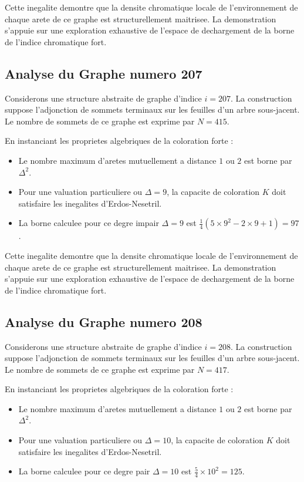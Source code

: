 \documentclass[11pt,a4paper]{article}
\begin{document}
Cette inegalite demontre que la densite chromatique locale de l'environnement de chaque arete de ce graphe est structurellement maitrisee. La demonstration s'appuie sur une exploration exhaustive de l'espace de dechargement de la borne de l'indice chromatique fort.

\subsection{Analyse du Graphe numero 207}
Considerons une structure abstraite de graphe d'indice $i = 207$. La construction suppose l'adjonction de sommets terminaux sur les feuilles d'un arbre sous-jacent. Le nombre de sommets de ce graphe est exprime par $N = 415$.

En instanciant les proprietes algebriques de la coloration forte :
\begin{itemize}
\item Le nombre maximum d'aretes mutuellement a distance $1$ ou $2$ est borne par $\Delta^2$.
\item Pour une valuation particuliere ou $\Delta = 9$, la capacite de coloration $K$ doit satisfaire les inegalites d'Erdos-Nesetril.
\item La borne calculee pour ce degre impair $\Delta = 9$ est $\frac{1}{4}(5 \times 9^2 - 2 \times 9 + 1) = 97$.
\end{itemize}

Cette inegalite demontre que la densite chromatique locale de l'environnement de chaque arete de ce graphe est structurellement maitrisee. La demonstration s'appuie sur une exploration exhaustive de l'espace de dechargement de la borne de l'indice chromatique fort.

\subsection{Analyse du Graphe numero 208}
Considerons une structure abstraite de graphe d'indice $i = 208$. La construction suppose l'adjonction de sommets terminaux sur les feuilles d'un arbre sous-jacent. Le nombre de sommets de ce graphe est exprime par $N = 417$.

En instanciant les proprietes algebriques de la coloration forte :
\begin{itemize}
\item Le nombre maximum d'aretes mutuellement a distance $1$ ou $2$ est borne par $\Delta^2$.
\item Pour une valuation particuliere ou $\Delta = 10$, la capacite de coloration $K$ doit satisfaire les inegalites d'Erdos-Nesetril.
\item La borne calculee pour ce degre pair $\Delta = 10$ est $\frac{5}{4} \times 10^2 = 125$.
\end{itemize}
\end{document}
